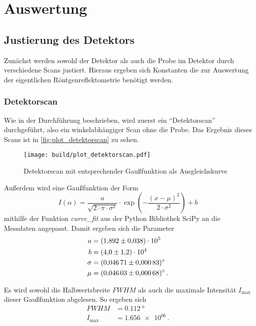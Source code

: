 \section{Auswertung}
\label{sec:Auswertung}

\subsection{Justierung des Detektors}
\label{ssec:Justierung}

Zunächst werden sowohl der Detektor als auch die Probe im Detektor durch verschiedene Scans justiert.
Hieraus ergeben sich Konstanten die zur Auswertung der eigentlichen Röntgenreflektometrie benötigt werden.

\subsubsection{Detektorscan}
\label{sssec:Detektorscan}

Wie in der Durchführung beschrieben, wird zuerst ein \enquote{Detektorscan} durchgeführt, also ein winkelabhängiger Scan ohne die Probe.
Das Ergebnis dieses Scans ist in \autoref{fig:plot_detektorscan} zu sehen. 

\begin{figure}
    \centering
    \texttt{[image: build/plot\_detektorscan.pdf]}
    \caption{Detektorscan mit entsprechender Gaußfunktion als Ausgleichskurve}
    \label{fig:plot_detektorscan}
\end{figure}

Außerdem wird eine Gaußfunktion der Form
\begin{equation}
    I(\alpha) = \frac{a}{\sqrt{2 \cdot \pi \cdot \sigma^2}} \cdot \exp\left(-\frac{(x - \mu)^2}{2 \cdot \sigma^2}\right) + b
\end{equation}
mithilfe der Funktion \textit{curve\_fit} aus der Python Bibliothek SciPy an die Messdaten angepasst.
Damit ergeben sich die Parameter 
\begin{align*}
    a &= \num{1.892+-0.038e+05} \\
    b &= \num{4.0+-1.2e+04} \\
    \sigma &= \SI{0.04671+-0.00083}{\degree} \\
    \mu &= \SI{0.04603+-0.00068}{\degree} \, .
\end{align*}

Es wird sowohl die Halbwertsbreite $FWHM$ als auch die maximale Intensität $I_\text{max}$ dieser Gaußfunktion abgelesen.
So ergeben sich
\begin{align*}
    FWHM &= \SI{0.112}{\degree} \\
    I_\text{max} &= \num{1.656e+06} \, .
\end{align*}

